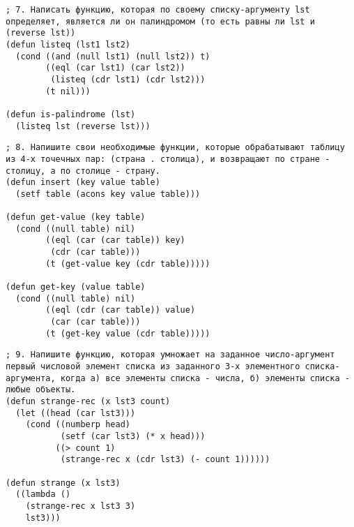 \documentclass[a4paper,oneside,14pt]{extarticle}
\begin{document}
\begin{lstlisting}
; 7. Написать функцию, которая по своему списку-аргументу lst определяет, является ли он палиндромом (то есть равны ли lst и (reverse lst))
(defun listeq (lst1 lst2)
  (cond ((and (null lst1) (null lst2)) t)
        ((eql (car lst1) (car lst2))
         (listeq (cdr lst1) (cdr lst2)))
        (t nil)))

(defun is-palindrome (lst)
  (listeq lst (reverse lst)))
\end{lstlisting}

\begin{lstlisting}
; 8. Напишите свои необходимые функции, которые обрабатывают таблицу из 4-х точечных пар: (страна . столица), и возвращают по стране - столицу, а по столице - страну.
(defun insert (key value table)
  (setf table (acons key value table)))

(defun get-value (key table)
  (cond ((null table) nil)
        ((eql (car (car table)) key)
         (cdr (car table)))
        (t (get-value key (cdr table)))))

(defun get-key (value table)
  (cond ((null table) nil)
        ((eql (cdr (car table)) value)
         (car (car table)))
        (t (get-key value (cdr table)))))
\end{lstlisting}

\begin{lstlisting}
; 9. Напишите функцию, которая умножает на заданное число-аргумент первый числовой элемент списка из заданного 3-х элементного списка-аргумента, когда а) все элементы списка - числа, б) элементы списка - любые объекты.
(defun strange-rec (x lst3 count)
  (let ((head (car lst3)))
    (cond ((numberp head)
           (setf (car lst3) (* x head)))
          ((> count 1)
           (strange-rec x (cdr lst3) (- count 1))))))

(defun strange (x lst3)
  ((lambda ()
    (strange-rec x lst3 3)
    lst3)))
\end{lstlisting}

\end{document}
